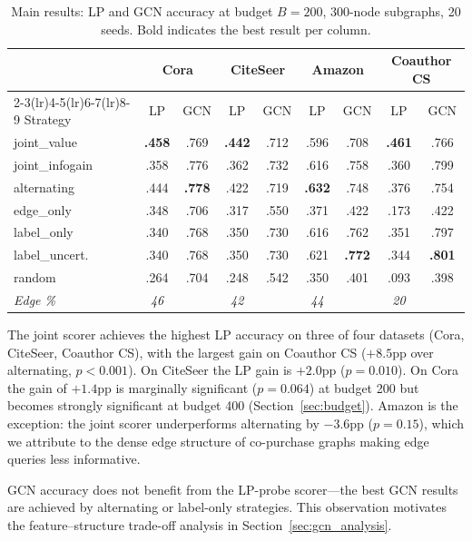\documentclass[12pt,a4paper,oneside]{report}
\begin{document}
\begin{table}[htbp]
\centering
\caption{Main results: LP and GCN accuracy at budget $B=200$, 300-node subgraphs, 20 seeds. Bold indicates the best result per column.}
\label{tab:main}
\small
\begin{tabular}{l cc cc cc cc}
\toprule
 & \multicolumn{2}{c}{Cora} & \multicolumn{2}{c}{CiteSeer} & \multicolumn{2}{c}{Amazon} & \multicolumn{2}{c}{Coauthor CS} \\
\cmidrule(lr){2-3}\cmidrule(lr){4-5}\cmidrule(lr){6-7}\cmidrule(lr){8-9}
Strategy & LP & GCN & LP & GCN & LP & GCN & LP & GCN \\
\midrule
joint\_value    & \textbf{.458} & .769 & \textbf{.442} & .712 & .596 & .708 & \textbf{.461} & .766 \\
joint\_infogain & .358 & .776 & .362 & .732 & .616 & .758 & .360 & .799 \\
alternating     & .444 & \textbf{.778} & .422 & .719 & \textbf{.632} & .748 & .376 & .754 \\
edge\_only      & .348 & .706 & .317 & .550 & .371 & .422 & .173 & .422 \\
label\_only     & .340 & .768 & .350 & .730 & .616 & .762 & .351 & .797 \\
label\_uncert.  & .340 & .768 & .350 & .730 & .621 & \textbf{.772} & .344 & \textbf{.801} \\
random          & .264 & .704 & .248 & .542 & .350 & .401 & .093 & .398 \\
\midrule
\textit{Edge \%} & \textit{46} & & \textit{42} & & \textit{44} & & \textit{20} & \\
\bottomrule
\end{tabular}
\end{table}

The joint scorer achieves the highest LP accuracy on three of four datasets (Cora, CiteSeer, Coauthor CS), with the largest gain on Coauthor CS ($+8.5$pp over alternating, $p < 0.001$). On CiteSeer the LP gain is $+2.0$pp ($p = 0.010$). On Cora the gain of $+1.4$pp is marginally significant ($p = 0.064$) at budget 200 but becomes strongly significant at budget 400 (Section~\ref{sec:budget}). Amazon is the exception: the joint scorer underperforms alternating by $-3.6$pp ($p = 0.15$), which we attribute to the dense edge structure of co-purchase graphs making edge queries less informative.

GCN accuracy does not benefit from the LP-probe scorer---the best GCN results are achieved by alternating or label-only strategies. This observation motivates the feature--structure trade-off analysis in Section~\ref{sec:gcn_analysis}.
\end{document}

